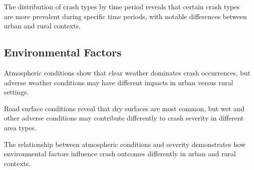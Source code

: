 \documentclass[12pt,a4paper]{article}
\begin{document}
The distribution of crash types by time period reveals that certain crash types are more prevalent during specific time periods, with notable differences between urban and rural contexts. %


\subsection{Environmental Factors}

Atmospheric conditions show that clear weather dominates crash occurrences, but adverse weather conditions may have different impacts in urban versus rural settings. %


Road surface conditions reveal that dry surfaces are most common, but wet and other adverse conditions may contribute differently to crash severity in different area types. %


The relationship between atmospheric conditions and severity demonstrates how environmental factors influence crash outcomes differently in urban and rural contexts. %

\end{document}

